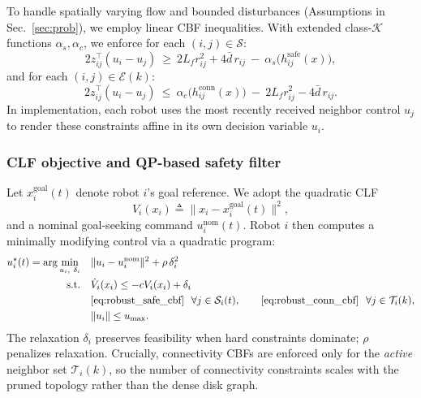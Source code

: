 \documentclass[conference]{IEEEconf}
\theoremstyle{plain}
\begin{document}
To handle spatially varying flow and bounded disturbances (Assumptions in Sec.~\ref{sec:prob}), we employ linear CBF inequalities.
With extended class-$\mathcal{K}$ functions $\alpha_s,\alpha_c$, we enforce for each $(i,j)\in\mathcal{S}$:
\begin{equation}
2 z_{ij}^\top (u_i-u_j)\ \ge\ 2L_f r_{ij}^2 + 4\bar d\, r_{ij}\ -\ \alpha_s\!\big(h^{\mathrm{safe}}_{ij}(x)\big),
\label{eq:robust_safe_cbf}
\end{equation}
and for each $(i,j)\in\mathcal{E}(k)$:
\begin{equation}
2 z_{ij}^\top (u_i-u_j)\ \le\ \alpha_c\!\big(h^{\mathrm{conn}}_{ij}(x)\big)\ -\ 2L_f r_{ij}^2 - 4\bar d\, r_{ij}.
\label{eq:robust_conn_cbf}
\end{equation}
In implementation, each robot uses the most recently received neighbor control $u_j$ to render these constraints affine in its own decision variable $u_i$.

\subsubsection{CLF objective and QP-based safety filter}
Let $x_i^{\mathrm{goal}}(t)$ denote robot $i$'s goal reference.
We adopt the quadratic CLF
\begin{equation}
V_i(x_i) \triangleq \|x_i-x_i^{\mathrm{goal}}(t)\|^2,
\label{eq:clf_V}
\end{equation}
and a nominal goal-seeking command $u_i^{\mathrm{nom}}(t)$.
Robot $i$ then computes a minimally modifying control via a quadratic program:
\begin{align}
u_i^\star(t) = \arg\min_{u_i,\ \delta_i}\quad &
\|u_i-u_i^{\mathrm{nom}}\|^2 + \rho\,\delta_i^2
\label{eq:clf_cbf_qp_obj}\\
\text{s.t.}\quad
& \dot V_i(x_i) \le -c V_i(x_i) + \delta_i
\label{eq:clf_constraint}\\
& \eqref{eq:robust_safe_cbf}\ \ \forall j\in\mathcal{S}_i(t),\qquad
\eqref{eq:robust_conn_cbf}\ \ \forall j\in\mathcal{T}_i(k),
\label{eq:cbf_constraints}\\
& \|u_i\|\le u_{\max}.
\label{eq:input_bound}
\end{align}
The relaxation $\delta_i$ preserves feasibility when hard constraints dominate; $\rho$ penalizes relaxation.
Crucially, connectivity CBFs are enforced only for the \emph{active} neighbor set $\mathcal{T}_i(k)$, so the number of connectivity constraints scales with the pruned topology rather than the dense disk graph.
\end{document}
